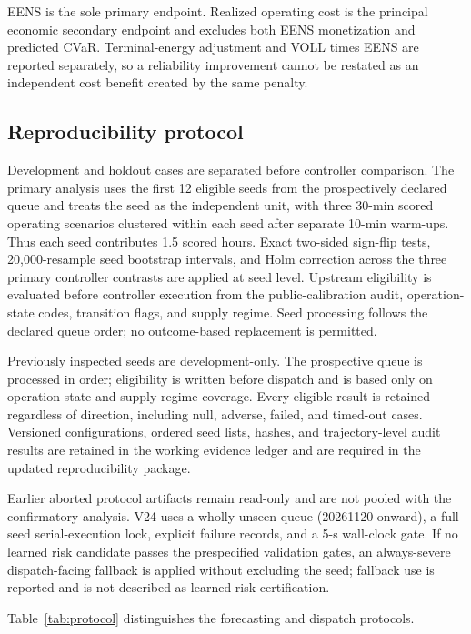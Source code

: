 EENS is the sole primary endpoint. Realized operating cost is the principal
economic secondary endpoint and excludes both EENS monetization and predicted
CVaR. Terminal-energy adjustment and VOLL times EENS are reported separately,
so a reliability improvement cannot be restated as an independent cost benefit
created by the same penalty.

\subsection{Reproducibility protocol}\label{reproducibility-protocol}

Development and holdout cases are separated before controller comparison. The
primary analysis uses the first 12 eligible seeds from the prospectively
declared queue and treats the seed as the independent unit, with three
30-min scored operating scenarios clustered within each seed after separate
10-min warm-ups. Thus each seed contributes 1.5 scored hours. Exact
two-sided sign-flip tests, 20,000-resample seed bootstrap intervals, and Holm
correction across the three primary controller contrasts are applied at seed
level.
Upstream eligibility is evaluated before controller execution from the
public-calibration audit, operation-state codes, transition flags, and supply
regime. Seed processing follows the declared queue order; no outcome-based
replacement is permitted.

Previously inspected seeds are development-only. The prospective queue is
processed in order; eligibility is written before dispatch and is based only on
operation-state and supply-regime coverage. Every eligible result is retained
regardless of direction, including null, adverse, failed, and timed-out cases.
Versioned configurations, ordered seed lists, hashes, and trajectory-level
audit results are retained in the working evidence ledger and are required in
the updated reproducibility package.

Earlier aborted protocol artifacts remain read-only and are not pooled with the
confirmatory analysis. V24 uses a wholly unseen queue (20261120 onward), a
full-seed serial-execution lock, explicit failure records, and a 5-s wall-clock
gate. If no learned risk candidate passes the prespecified validation gates, an
always-severe dispatch-facing fallback is applied without excluding the seed;
fallback use is reported and is not described as learned-risk certification.

Table~\ref{tab:protocol} distinguishes the forecasting and dispatch protocols.


